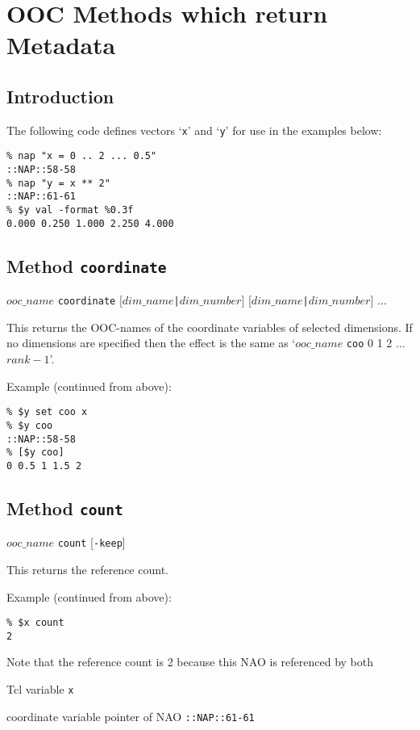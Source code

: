 
\section{OOC Methods which return Metadata}
    \label{ooc-meta}

\subsection{Introduction}
    \label{ooc-meta-intro}

The following code defines vectors `\texttt{x}' and `\texttt{y}' for use in the examples below:
  \begin{verbatim}
% nap "x = 0 .. 2 ... 0.5"
::NAP::58-58
% nap "y = x ** 2"
::NAP::61-61
% $y val -format %0.3f
0.000 0.250 1.000 2.250 4.000
\end{verbatim}

\subsection{Method \texttt{coordinate}}
    \label{ooc-meta-coordinate}

$ooc\_name$ \texttt{coordinate}
[$dim\_name$\texttt{|}$dim\_number$]
[$dim\_name$\texttt{|}$dim\_number$]
$\ldots$

This returns the OOC-names of the coordinate variables of selected
  dimensions. If no dimensions are specified then the effect is the
  same as `$ooc\_name$ \texttt{coo} 0 1 2 $\ldots$ $rank-1$'.

Example (continued from above):
  \begin{verbatim}
% $y set coo x
% $y coo
::NAP::58-58
% [$y coo]
0 0.5 1 1.5 2
\end{verbatim}

\subsection{Method \texttt{count}}
    \label{ooc-meta-count}

$ooc\_name$ \texttt{count} [\texttt{-keep}]

This returns the reference count.
  

Example (continued from above):
  \begin{verbatim}
% $x count
2
\end{verbatim}

Note that the reference count is 2 because this NAO is referenced
by both
\begin{bullets}
    \item Tcl variable 
    \texttt{x}
    \item coordinate variable pointer of NAO 
    \texttt{::NAP::61-61}
\end{bullets}


